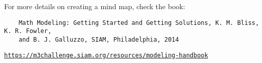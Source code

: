 \begin{graybox}
\begin{minipage}{.75\textwidth}
For more details on creating a mind map, check the book:
\begin{verbatim}
	Math Modeling: Getting Started and Getting Solutions, K. M. Bliss, K. R. Fowler, 
	and B. J. Galluzzo, SIAM, Philadelphia, 2014
\end{verbatim}
\begin{center}
\href{https://m3challenge.siam.org/resources/modeling-handbook}{\tt https://m3challenge.siam.org/resources/modeling-handbook}
\end{center}
\end{minipage}
\hfill
\begin{minipage}{.20\textwidth}
	\hfill{}	
\end{minipage}
\end{graybox}





